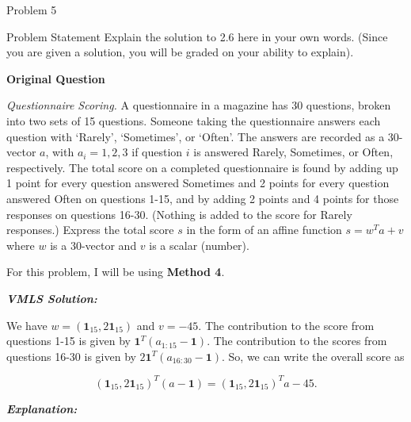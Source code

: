 \begin{problem}{Problem 5}
    \begin{statement}{Problem Statement}
        Explain the solution to 2.6 here in your own words. (Since you are given a solution, you will be graded on your ability to explain). \vspace*{1em}

        \textbf{Original Question} \vspace*{1em}

        \textit{Questionnaire Scoring.} A questionnaire in a magazine has 30 questions, broken into two sets of 15 questions. Someone taking the questionnaire answers each question with `Rarely',
        `Sometimes', or `Often'. The answers are recorded as a 30-vector $a$, with $a_{i} = 1,2,3$ if question $i$ is answered Rarely, Sometimes, or Often, respectively. The total score on a completed
        questionnaire is found by adding up 1 point for every question answered Sometimes and 2 points for every question answered Often on questions 1-15, and by adding 2 points and 4 points for those
        responses on questions 16-30. (Nothing is added to the score for Rarely responses.) Express the total score $s$ in the form of an affine function $s = w^{T}a + v$ where $w$ is a 30-vector and $v$
        is a scalar (number).
    \end{statement}

    \begin{Highlight}[Solution]
        For this problem, I will be using \textbf{Method 4}. \vspace*{1em}

        \textbf{\textit{VMLS Solution:}} \vspace*{1em}

        We have $w = (\mathbf{1}_{15},2\mathbf{1}_{15})$ and $v = -45$. The contribution to the score from questions 1-15 is given by $\mathbf{1}^{T}(a_{1:15}-\mathbf{1})$. The contribution to the scores 
        from questions 16-30 is given by $2\mathbf{1}^{T}(a_{16:30}-\mathbf{1})$. So, we can write the overall score as

        \setcounter{equation}{0}
        \begin{equation}
            (\mathbf{1}_{15},2\mathbf{1}_{15})^{T}(a-\mathbf{1}) = (\mathbf{1}_{15},2\mathbf{1}_{15})^{T}a - 45.
        \end{equation}

        \textbf{\textit{Explanation:}} \vspace*{1em}


\end{Highlight}
\end{problem}
